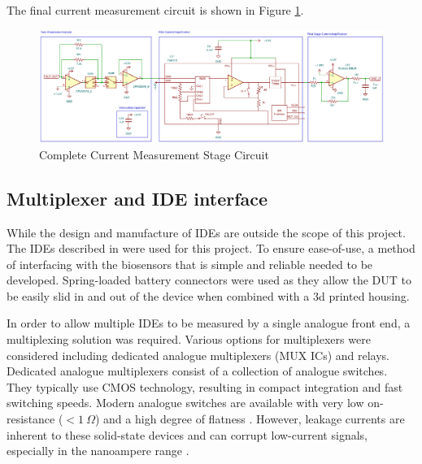 The final current measurement circuit is shown in Figure \ref{fig:imeas_stage_circuit}.
\begin{figure}[H]
    \centering
    \includegraphics[width=\textwidth]{IMeasSchem.png}
    \caption{Complete Current Measurement Stage Circuit}
    \label{fig:imeas_stage_circuit}
\end{figure}

\subsection{Multiplexer and IDE interface}
While the design and manufacture of \acp{IDE} are outside the scope of this project. The \acp{IDE} described in \cite{ebrahimDevelopmentBiosensorEarly2023} were used for this project. To ensure ease-of-use, a method of interfacing with the biosensors that is simple and reliable needed to be developed. Spring-loaded battery connectors were used as they allow the DUT to be easily slid in and out of the device when combined with a 3d printed housing.

In order to allow multiple \acp{IDE} to be measured by a single analogue front end, a multiplexing solution was required. Various options for multiplexers were considered including dedicated analogue multiplexers (MUX ICs) and relays. Dedicated analogue multiplexers consist of a collection of analogue switches. They typically use CMOS technology, resulting in compact integration and fast switching speeds. Modern analogue switches are available with very low on-resistance ($<1~\Omega$) and a high degree of flatness \cite{SelectingRightCMOS}. However, leakage currents are inherent to these solid-state devices and can corrupt low-current signals, especially in the nanoampere range \cite{SelectingRightCMOS}. 


